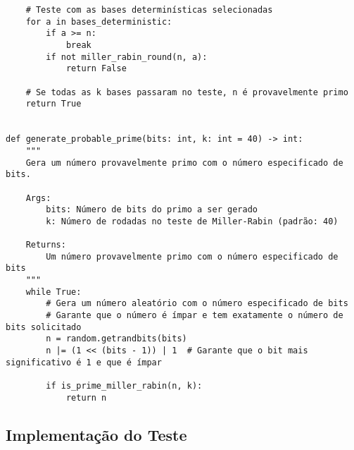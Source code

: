 \begin{verbatim}
    # Teste com as bases determinísticas selecionadas
    for a in bases_deterministic:
        if a >= n:
            break
        if not miller_rabin_round(n, a):
            return False
    
    # Se todas as k bases passaram no teste, n é provavelmente primo
    return True


def generate_probable_prime(bits: int, k: int = 40) -> int:
    """
    Gera um número provavelmente primo com o número especificado de bits.
    
    Args:
        bits: Número de bits do primo a ser gerado
        k: Número de rodadas no teste de Miller-Rabin (padrão: 40)
    
    Returns:
        Um número provavelmente primo com o número especificado de bits
    """
    while True:
        # Gera um número aleatório com o número especificado de bits
        # Garante que o número é ímpar e tem exatamente o número de bits solicitado
        n = random.getrandbits(bits)
        n |= (1 << (bits - 1)) | 1  # Garante que o bit mais significativo é 1 e que é ímpar
        
        if is_prime_miller_rabin(n, k):
            return n
\end{verbatim}

\subsection{Implementação do Teste}

